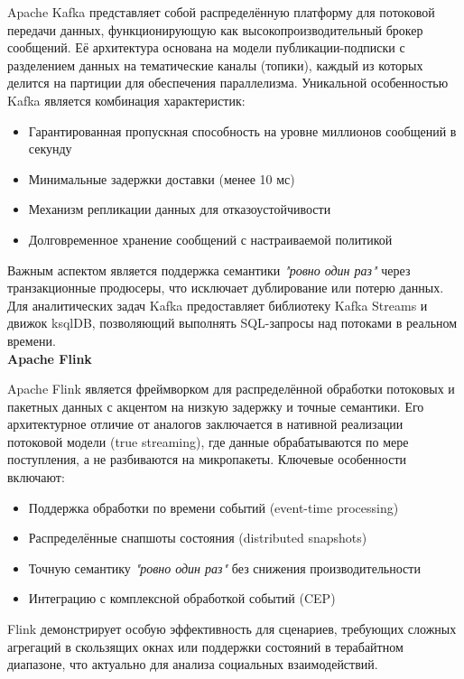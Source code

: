             Apache Kafka представляет собой распределённую платформу для потоковой передачи данных, функционирующую как высокопроизводительный брокер сообщений. Её архитектура основана на модели публикации-подписки с разделением данных на тематические каналы (топики), каждый из которых делится на партиции для обеспечения параллелизма. Уникальной особенностью Kafka является комбинация характеристик: 
            \begin{itemize}
                \item Гарантированная пропускная способность на уровне миллионов сообщений в секунду
                \item Минимальные задержки доставки (менее 10 мс)
                \item Механизм репликации данных для отказоустойчивости
                \item Долговременное хранение сообщений с настраиваемой политикой
            \end{itemize}

            Важным аспектом является поддержка семантики \textit{"ровно один раз"} через транзакционные продюсеры, что исключает дублирование или потерю данных. Для аналитических задач Kafka предоставляет библиотеку Kafka Streams и движок ksqlDB, позволяющий выполнять SQL-запросы над потоками в реальном времени. \\

            \textbf{Apache Flink}

            Apache Flink является фреймворком для распределённой обработки потоковых и пакетных данных с акцентом на низкую задержку и точные семантики. Его архитектурное отличие от аналогов заключается в нативной реализации потоковой модели (true streaming), где данные обрабатываются по мере поступления, а не разбиваются на микропакеты. Ключевые особенности включают:
            \begin{itemize}
                \item Поддержка обработки по времени событий (event-time processing)
                \item Распределённые снапшоты состояния (distributed snapshots)
                \item Точную семантику \textit{"ровно один раз"} без снижения производительности
                \item Интеграцию с комплексной обработкой событий (CEP)
            \end{itemize}

            Flink демонстрирует особую эффективность для сценариев, требующих сложных агрегаций в скользящих окнах или поддержки состояний в терабайтном диапазоне, что актуально для анализа социальных взаимодействий. \\

